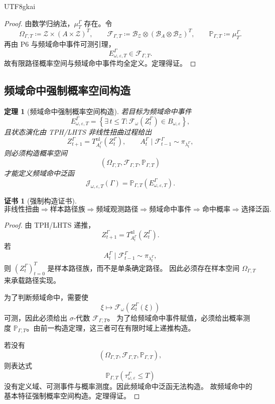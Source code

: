 \documentclass[12pt]{article}
\newtheorem{theorem}{定理}[section]
\newtheorem{Certificate}{证书}[section]
\newcommand{\DefEq}{\coloneqq}
\newcommand{\Prob}{\mathbb P}
\newcommand{\Fil}{\mathcal F}
\begin{document}
\begin{CJK*}{UTF8}{gkai}
\begin{proof}
由数学归纳法，\(\mu_T^\Gamma\) 存在。令
\[
\Omega_{\Gamma,T}
\DefEq
\mathcal Z\times(A\times\mathcal Z)^T,
\qquad
\mathscr F_{\Gamma,T}
\DefEq
\mathscr B_{\mathcal Z}\otimes(\mathscr B_A\otimes\mathscr B_{\mathcal Z})^T,
\qquad
\Prob_{\Gamma,T}
\DefEq
\mu_T^\Gamma.
\]
再由 P6 与频域命中事件可测引理，
\[
E_{\omega,\varepsilon,T}^{\Gamma}\in\mathscr F_{\Gamma,T}.
\]
故有限路径概率空间与频域命中事件均全定义。定理得证。
\end{proof}

\subsection{频域命中强制概率空间构造}
\label{subsec:frequency-hit-forces-probability-space}

\begin{theorem}[频域命中强制概率空间构造]
若目标为频域命中事件
\[
E_{\omega,\varepsilon,T}^{\Gamma}
=
\left\{
\exists\,t\le T:
\mathcal F_\omega(Z_t^\Gamma)\in B_{\omega,\varepsilon}
\right\},
\]
且状态演化由 TPH/LHTS 非线性扭曲过程给出
\[
Z_{t+1}^{\Gamma}
=
T_{A_t^\Gamma}^{\mathrm{nl}}(Z_t^\Gamma),
\qquad
A_t^\Gamma\mid\Fil_{t-1}^{\Gamma}\sim\pi_{\lambda_t^\Gamma},
\]
则必须构造概率空间
\[
(\Omega_{\Gamma,T},\mathscr F_{\Gamma,T},\Prob_{\Gamma,T})
\]
才能定义频域命中泛函
\[
\mathcal J_{\omega,\varepsilon,T}(\Gamma)
=
\Prob_{\Gamma,T}(E_{\omega,\varepsilon,T}^{\Gamma}).
\]
\end{theorem}

\begin{Certificate}[强制构造证书]
\[
\boxed{
\text{非线性扭曲}
\Rightarrow
\text{样本路径族}
\Rightarrow
\text{频域观测路径}
\Rightarrow
\text{频域命中事件}
\Rightarrow
\text{命中概率}
\Rightarrow
\text{选择泛函}.
}
\]
\end{Certificate}

\begin{proof}
由 TPH/LHTS 递推，
\[
Z_{t+1}^{\Gamma}=T_{A_t^\Gamma}^{\mathrm{nl}}(Z_t^\Gamma).
\]
若
\[
A_t^\Gamma\mid\Fil_{t-1}^{\Gamma}\sim\pi_{\lambda_t^\Gamma},
\]
则 \((Z_t^\Gamma)_{t=0}^{T}\) 是样本路径族，而不是单条确定路径。
因此必须存在样本空间 \(\Omega_{\Gamma,T}\) 来承载路径实现。

为了判断频域命中，需要使
\[
\xi\mapsto \mathcal F_\omega(Z_t^\Gamma(\xi))
\]
可测，因此必须给出 \(\sigma\)-代数 \(\mathscr F_{\Gamma,T}\)。
为了给频域命中事件赋值，必须给出概率测度
\(\Prob_{\Gamma,T}\)。由前一构造定理，这三者可在有限时域上递推构造。

若没有
\[
(\Omega_{\Gamma,T},\mathscr F_{\Gamma,T},\Prob_{\Gamma,T}),
\]
则表达式
\[
\Prob_{\Gamma,T}(\tau_{\omega,\varepsilon}^{\Gamma}\le T)
\]
没有定义域、可测事件与概率测度。因此频域命中泛函无法构造。
故频域命中的基本特征强制概率空间构造。定理得证。
\end{proof}


\end{CJK*}
\end{document}

